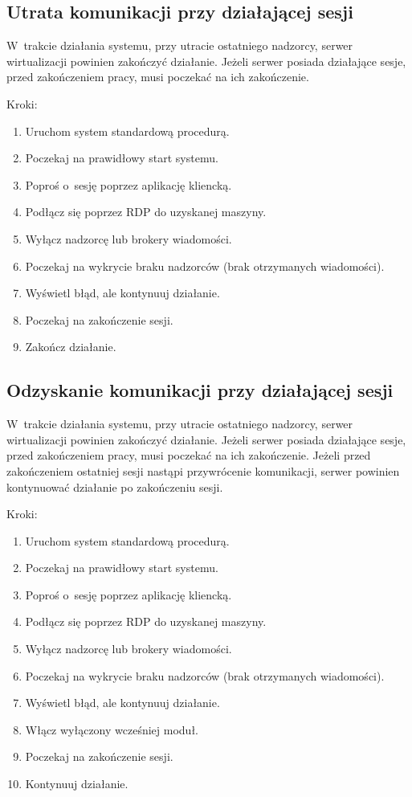 \documentclass[../analiza-rozwiazania.tex]{subfiles}
\begin{document}
\subsection{Utrata komunikacji przy działającej sesji}
W~trakcie działania systemu, przy utracie ostatniego nadzorcy, serwer wirtualizacji powinien zakończyć działanie. Jeżeli serwer posiada działające sesje, przed zakończeniem pracy, musi poczekać na ich zakończenie.

Kroki:
\begin{enumerate}
  \item Uruchom system standardową procedurą.
  \item Poczekaj na prawidłowy start systemu.
  \item Poproś o~sesję poprzez aplikację kliencką.
  \item Podłącz się poprzez RDP do uzyskanej maszyny.
  \item Wyłącz nadzorcę lub brokery wiadomości.
  \item Poczekaj na wykrycie braku nadzorców (brak otrzymanych wiadomości).
  \item Wyświetl błąd, ale kontynuuj działanie.
  \item Poczekaj na zakończenie sesji.
  \item Zakończ działanie.
\end{enumerate}

\subsection{Odzyskanie komunikacji przy działającej sesji}
W~trakcie działania systemu, przy utracie ostatniego nadzorcy, serwer wirtualizacji powinien zakończyć działanie. Jeżeli serwer posiada działające sesje, przed zakończeniem pracy, musi poczekać na ich zakończenie. Jeżeli przed zakończeniem ostatniej sesji nastąpi przywrócenie komunikacji, serwer powinien kontynuować działanie po zakończeniu sesji.

Kroki:
\begin{enumerate}
  \item Uruchom system standardową procedurą.
  \item Poczekaj na prawidłowy start systemu.
  \item Poproś o~sesję poprzez aplikację kliencką.
  \item Podłącz się poprzez RDP do uzyskanej maszyny.
  \item Wyłącz nadzorcę lub brokery wiadomości.
  \item Poczekaj na wykrycie braku nadzorców (brak otrzymanych wiadomości).
  \item Wyświetl błąd, ale kontynuuj działanie.
  \item Włącz wyłączony wcześniej moduł.
  \item Poczekaj na zakończenie sesji.
  \item Kontynuuj działanie.
\end{enumerate}
\end{document}
